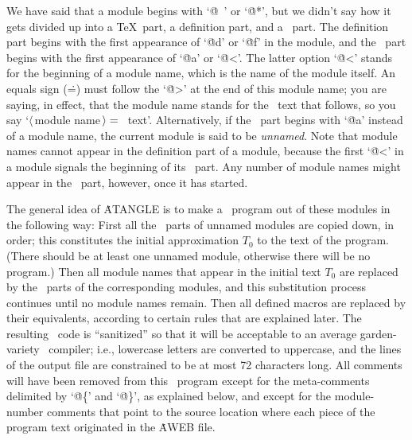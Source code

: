 We have said that a module begins with `\.{@\ }' or `\.{@*}', but we
didn't say how it gets divided up into a \TeX\ part, a definition part,
and a \ADA\ part. The definition part begins with the first appearance
of `\.{@d}' or `\.{@f}' in the module, and the \ADA\ part begins with
the first appearance of `\.{@a}' or `\.{@<}'. The latter option `\.{@<}'
stands for the beginning of a module name, which is the name of the module
itself. An equals sign (\.=) must follow the `\.{@>}' at the end of this
module name; you are saying, in effect, that the module name stands for
the \ADA\ text that follows, so you say `$\langle\,$module
name$\,\rangle=\null$\ADA\ text'. Alternatively, if the \ADA\ part
begins with `\.{@a}' instead of a module name, the current module is said
to be {\sl unnamed}. Note that module names cannot appear in the
definition part of a module, because the first `\.{@<}' in a module
signals the beginning of its \ADA\ part.  Any number of module names
might appear in the \ADA\ part, however, once it has started.
 
The general idea of \.{ATANGLE} is to make a \ADA\ program out of these
modules in the following way: First all the \ADA\ parts of unnamed
modules are copied down, in order; this constitutes the initial
approximation $T_0$ to the text of the program. (There should be at least
one unnamed module, otherwise there will be no program.) Then all module
names that appear in the initial text $T_0$ are replaced by the \ADA\
parts of the corresponding modules, and this substitution process
continues until no module names remain. Then all defined macros are
replaced by their equivalents, according to certain rules that are
explained later. The resulting \ADA\ code is ``sanitized'' so that it
will be acceptable to an average garden-variety \ADA\ compiler; i.e.,
lowercase letters are converted to uppercase, and the lines of the output 
file are constrained to be at most 72 characters long.  All comments will 
have been removed from this \ADA\ program except for the meta-comments 
delimited by `\.{@\{}' and `\.{@\}}', as explained below, and except for the 
module-number comments that point to the source location where each piece of 
the program text originated in the \.{AWEB} file.
 
